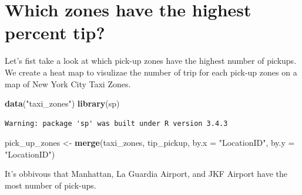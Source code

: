 \documentclass[12pt,twoside]{reedthesis}
\newenvironment{Shaded}{\begin{snugshade}}{\end{snugshade}}
\newcommand{\KeywordTok}[1]{\textcolor[rgb]{0.13,0.29,0.53}{\textbf{#1}}}
\newcommand{\DataTypeTok}[1]{\textcolor[rgb]{0.13,0.29,0.53}{#1}}
\newcommand{\StringTok}[1]{\textcolor[rgb]{0.31,0.60,0.02}{#1}}
\newcommand{\CommentTok}[1]{\textcolor[rgb]{0.56,0.35,0.01}{\textit{#1}}}
\newcommand{\OtherTok}[1]{\textcolor[rgb]{0.56,0.35,0.01}{#1}}
\newcommand{\NormalTok}[1]{#1}
\theoremstyle{definition}
\theoremstyle{definition}
\theoremstyle{definition}
\theoremstyle{remark}
\begin{document}
\section{Which zones have the highest percent
tip?}\label{which-zones-have-the-highest-percent-tip}

Let's fist take a look at which pick-up zones have the highest number of
pickups. We create a heat map to visulizae the number of trip for each
pick-up zones on a map of New York City Taxi Zones.
\begin{Shaded}
\begin{Highlighting}[]
\KeywordTok{data}\NormalTok{(}\StringTok{"taxi_zones"}\NormalTok{)}
\KeywordTok{library}\NormalTok{(sp)}
\end{Highlighting}
\end{Shaded}
\begin{verbatim}
Warning: package 'sp' was built under R version 3.4.3
\end{verbatim}
\begin{Shaded}
\begin{Highlighting}[]
\NormalTok{pick_up_zones <-}\StringTok{ }\KeywordTok{merge}\NormalTok{(taxi_zones, tip_pickup, }\DataTypeTok{by.x =} \StringTok{"LocationID"}\NormalTok{, }
    \DataTypeTok{by.y =} \StringTok{"LocationID"}\NormalTok{)}
\end{Highlighting}
\end{Shaded}
\begin{Shaded}
\end{Shaded}
It's obbivous that Manhattan, La Guardia Airport, and JKF Airport have
the most number of pick-ups.
\end{document}
